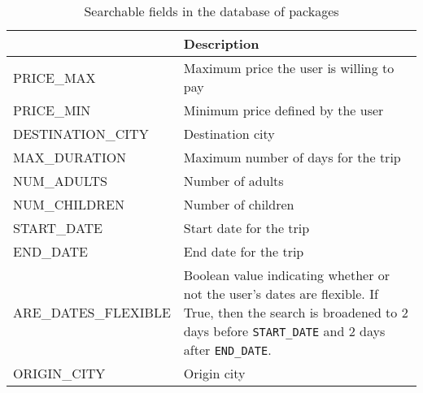\documentclass{article}
\theoremstyle{definition}
\begin{document}
\begin{table}[!h]
\begin{center}
  \tabulinesep=2pt
\caption{Searchable fields in the database of packages}
\begin{tabu}to 
\toprule
{}       & \textbf{Description}                                                   \\\midrule
PRICE\_MAX           & Maximum price the user is willing to pay                               \\
PRICE\_MIN           & Minimum price defined by the user                                      \\
DESTINATION\_CITY    & Destination city                                                       \\
MAX\_DURATION        & Maximum number of days for the trip                                    \\
NUM\_ADULTS          & Number of adults                                                       \\
NUM\_CHILDREN        & Number of children                                                     \\
START\_DATE          & Start date for the trip                                                \\
END\_DATE            & End date for the trip                                                  \\
ARE\_DATES\_FLEXIBLE & Boolean value indicating whether or not the user's dates are flexible. 
                     If True, then the search is broadened to 2 days before \texttt{START\_DATE} 
                      and 2 days after \texttt{END\_DATE}.                                            \\
ORIGIN\_CITY         & Origin city                                                            \\
\bottomrule
\end{tabu}
\label{tab:searchable_fields}
\end{center}
\end{table}
\end{document}
